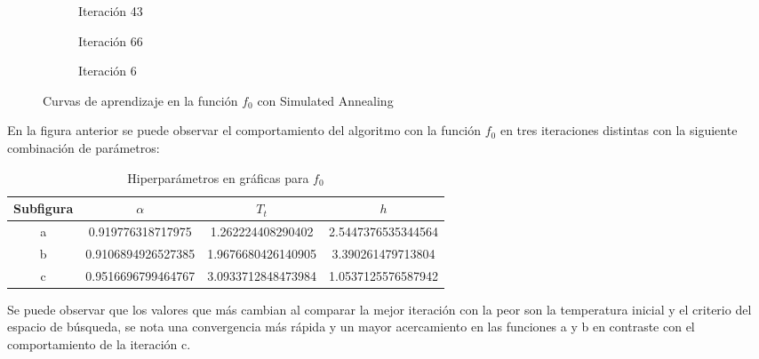 \begin{figure}[h!]
     \centering
     \begin{subfigure}[b]{0.45\textwidth}
         \centering
         
         \caption{Iteración 43}
         \label{fig:learning-Simulated-Annealing-f0-72}
     \end{subfigure}
     \hfill
     \begin{subfigure}[b]{0.45\textwidth}
         \centering
         
         \caption{Iteración 66}
         \label{fig:learning-Simulated-Annealing-f0-9}
     \end{subfigure}
     \hfill
     \begin{subfigure}[b]{0.45\textwidth}
         \centering
         
         \caption{Iteración 6}
         \label{fig:learning-vanilla-f0-7}
     \end{subfigure}
        \caption{Curvas de aprendizaje en la función $f_0$ con Simulated Annealing}
        \label{fig:learning-curves-f0}
\end{figure}

En la figura anterior se puede observar el comportamiento del algoritmo con la función $f_0$ en tres iteraciones distintas con la siguiente combinación de parámetros:   

\begin{table}[H]
    \centering
    \caption{Hiperparámetros en gráficas para $f_0$}
    \begin{tabular}{|c|c|c|c|}
    \hline
    \textbf{Subfigura} & \textbf{$\alpha$} & \textbf{$T_t$} & \textbf{$h$}\\
    \hline
    a & 0.919776318717975 & 1.262224408290402 & 2.5447376535344564\\
    \hline
    b & 0.9106894926527385 & 1.9676680426140905 & 3.390261479713804 \\
    \hline
    c & 0.9516696799464767 & 3.0933712848473984 & 1.0537125576587942 \\
    \hline
    \end{tabular}
    \label{tab:hiper_simul_f0}
\end{table}

Se puede observar que los valores que más cambian al comparar la mejor iteración con la peor son la temperatura inicial y el criterio del espacio de búsqueda, se nota una convergencia más rápida y un mayor acercamiento en las funciones a y b en contraste con el comportamiento de la iteración c.

